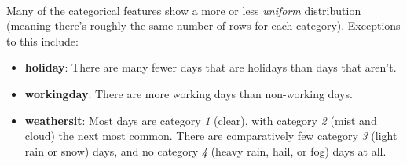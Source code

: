 \documentclass[11pt]{article}
\providecommand{\tightlist}{%
      \setlength{\itemsep}{0pt}\setlength{\parskip}{0pt}}
\begin{document}
    \begin{center}
    \end{center}
    { \hspace*{\fill} \\}
    
    \begin{center}
    \end{center}
    { \hspace*{\fill} \\}
    
    \begin{center}
    \end{center}
    { \hspace*{\fill} \\}
    
    \begin{center}
    \end{center}
    { \hspace*{\fill} \\}
    
    \begin{center}
    \end{center}
    { \hspace*{\fill} \\}
    
    \begin{center}
    \end{center}
    { \hspace*{\fill} \\}
    
    Many of the categorical features show a more or less \emph{uniform}
distribution (meaning there's roughly the same number of rows for each
category). Exceptions to this include:

\begin{itemize}
\tightlist
\item
  \textbf{holiday}: There are many fewer days that are holidays than
  days that aren't.
\item
  \textbf{workingday}: There are more working days than non-working
  days.
\item
  \textbf{weathersit}: Most days are category \emph{1} (clear), with
  category \emph{2} (mist and cloud) the next most common. There are
  comparatively few category \emph{3} (light rain or snow) days, and no
  category \emph{4} (heavy rain, hail, or fog) days at all.
\end{itemize}
\end{document}
